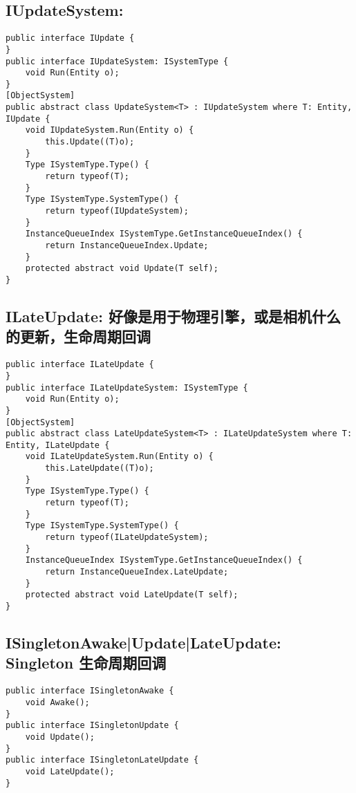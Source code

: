 \documentclass[9pt, b5paper]{article}
\begin{document}
\subsection{IUpdateSystem:}
\label{sec-1-8}
\begin{verbatim}
public interface IUpdate {
}
public interface IUpdateSystem: ISystemType {
    void Run(Entity o);
}
[ObjectSystem]
public abstract class UpdateSystem<T> : IUpdateSystem where T: Entity, IUpdate {
    void IUpdateSystem.Run(Entity o) {
        this.Update((T)o);
    }
    Type ISystemType.Type() {
        return typeof(T);
    }
    Type ISystemType.SystemType() {
        return typeof(IUpdateSystem);
    }
    InstanceQueueIndex ISystemType.GetInstanceQueueIndex() {
        return InstanceQueueIndex.Update;
    }
    protected abstract void Update(T self);
}
\end{verbatim}
\subsection{ILateUpdate: 好像是用于物理引擎，或是相机什么的更新，生命周期回调}
\label{sec-1-9}
\begin{verbatim}
public interface ILateUpdate {
}
public interface ILateUpdateSystem: ISystemType {
    void Run(Entity o);
}
[ObjectSystem]
public abstract class LateUpdateSystem<T> : ILateUpdateSystem where T: Entity, ILateUpdate {
    void ILateUpdateSystem.Run(Entity o) {
        this.LateUpdate((T)o);
    }
    Type ISystemType.Type() {
        return typeof(T);
    }
    Type ISystemType.SystemType() {
        return typeof(ILateUpdateSystem);
    }
    InstanceQueueIndex ISystemType.GetInstanceQueueIndex() {
        return InstanceQueueIndex.LateUpdate;
    }
    protected abstract void LateUpdate(T self);
}
\end{verbatim}
\subsection{ISingletonAwake|Update|LateUpdate: Singleton 生命周期回调}
\label{sec-1-10}
\begin{verbatim}
public interface ISingletonAwake {
    void Awake();
}
public interface ISingletonUpdate {
    void Update();
}
public interface ISingletonLateUpdate {
    void LateUpdate();
}
\end{verbatim}
\end{document}
